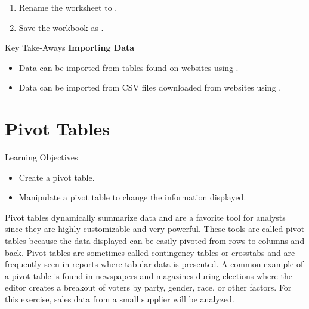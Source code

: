 \begin{enumerate}[resume]
	\item Rename the worksheet to .
	\item Save the workbook as .
\end{enumerate}

\begin{center}
	\begin{tkwbox}{Key Take-Aways}
		\textbf{Importing Data}
		\\
		\begin{itemize}
			\setlength{\itemsep}{0pt}
			\setlength{\parskip}{0pt}
			\setlength{\parsep}{0pt}
			
			\item Data can be imported from tables found on websites using . 
			\item Data can be imported from CSV files downloaded from websites using .
			
		\end{itemize}
	\end{tkwbox}
\end{center}

\section{Pivot Tables}

\begin{center}
	\begin{objbox}{Learning Objectives}
		\begin{itemize}
			\setlength{\itemsep}{0pt}
			\setlength{\parskip}{0pt}
			\setlength{\parsep}{0pt}

			\item Create a pivot table.
			\item Manipulate a pivot table to change the information displayed.
			
		\end{itemize}
	\end{objbox}
\end{center}

Pivot tables dynamically summarize data and are a favorite tool for analysts since they are highly customizable and very powerful. These tools are called pivot tables because the data displayed can be easily pivoted from rows to columns and back. Pivot tables are sometimes called contingency tables or crosstabs and are frequently seen in reports where tabular data is presented. A common example of a pivot table is found in newspapers and magazines during elections where the editor creates a breakout of voters by party, gender, race, or other factors. For this exercise, sales data from a small supplier will be analyzed.

